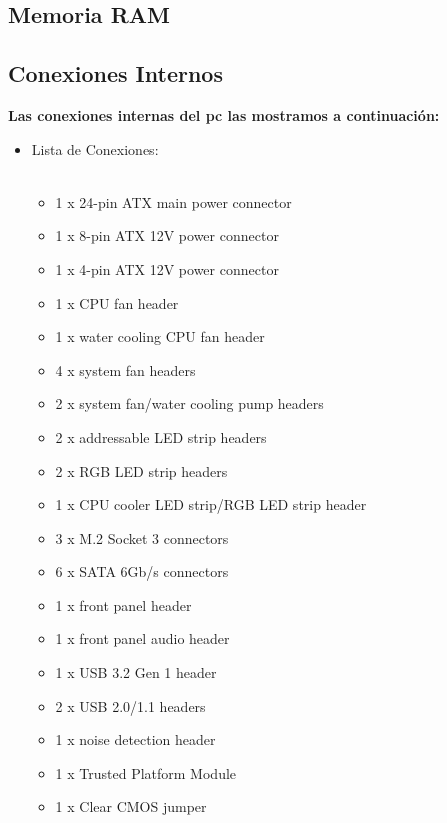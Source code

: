 \documentclass{article}
\begin{document}
  \newpage
    \subsection{Memoria RAM}

  \newpage
    \subsection{Conexiones Internos}
    \normalsize
      {\bfseries Las conexiones internas del pc las mostramos a continuación: }%
      \begin{itemize}
        \item Lista de Conexiones:\\
        \\
        \begin{minipage}{0.5\textwidth}
          \begin{itemize}%
            \item 1 x 24-pin ATX main power connector
            \item 1 x 8-pin ATX 12V power connector
            \item 1 x 4-pin ATX 12V power connector
            \item 1 x CPU fan header
            \item 1 x water cooling CPU fan header
            \item 4 x system fan headers
            \item 2 x system fan/water cooling pump headers
            \item 2 x addressable LED strip headers
            \item 2 x RGB LED strip headers
            \item 1 x CPU cooler LED strip/RGB LED strip header
            \item 3 x M.2 Socket 3 connectors
            \item 6 x SATA 6Gb/s connectors
            \item 1 x front panel header
            \item 1 x front panel audio header
            \item 1 x USB 3.2 Gen 1 header
            \item 2 x USB 2.0/1.1 headers
            \item 1 x noise detection header
            \item 1 x Trusted Platform Module
            \item 1 x Clear CMOS jumper

\end{itemize}
\end{minipage}
\end{itemize}
\end{document}
